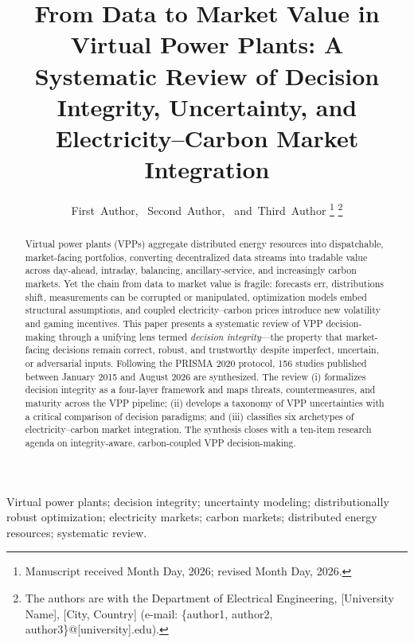 \documentclass[journal]{IEEEtran}
\begin{document}
\title{From Data to Market Value in Virtual Power Plants: A Systematic Review of Decision Integrity, Uncertainty, and Electricity--Carbon Market Integration}

\author{First~Author,~
        Second~Author,~
        and~Third~Author%
\thanks{Manuscript received Month Day, 2026; revised Month Day, 2026.}
\thanks{The authors are with the Department of Electrical Engineering,
[University Name], [City, Country] (e-mail: \{author1, author2, author3\}@[university].edu).}%
}


\maketitle

\begin{abstract}
Virtual power plants (VPPs) aggregate distributed energy resources into dispatchable, market-facing portfolios, converting decentralized data streams into tradable value across day-ahead, intraday, balancing, ancillary-service, and increasingly carbon markets. Yet the chain from data to market value is fragile: forecasts err, distributions shift, measurements can be corrupted or manipulated, optimization models embed structural assumptions, and coupled electricity--carbon prices introduce new volatility and gaming incentives. This paper presents a systematic review of VPP decision-making through a unifying lens termed \textit{decision integrity}---the property that market-facing decisions remain correct, robust, and trustworthy despite imperfect, uncertain, or adversarial inputs. Following the PRISMA 2020 protocol, 156 studies published between January 2015 and August 2026 are synthesized. The review (i) formalizes decision integrity as a four-layer framework and maps threats, countermeasures, and maturity across the VPP pipeline; (ii) develops a taxonomy of VPP uncertainties with a critical comparison of decision paradigms; and (iii) classifies six archetypes of electricity--carbon market integration. The synthesis closes with a ten-item research agenda on integrity-aware, carbon-coupled VPP decision-making.
\end{abstract}

\begin{IEEEkeywords}
Virtual power plants; decision integrity; uncertainty modeling; distributionally robust optimization; electricity markets; carbon markets; distributed energy resources; systematic review.
\end{IEEEkeywords}
\end{document}
